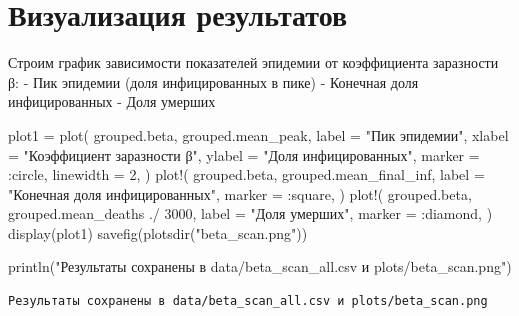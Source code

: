\documentclass[
  12pt,
  a4paper,
  DIV=11,
  numbers=noendperiod]{scrreprt}
\newenvironment{Shaded}{\begin{snugshade}}{\end{snugshade}}
\newcommand{\FloatTok}[1]{\textcolor[rgb]{0.68,0.00,0.00}{#1}}
\newcommand{\FunctionTok}[1]{\textcolor[rgb]{0.28,0.35,0.67}{#1}}
\newcommand{\NormalTok}[1]{\textcolor[rgb]{0.00,0.23,0.31}{#1}}
\newcommand{\OperatorTok}[1]{\textcolor[rgb]{0.37,0.37,0.37}{#1}}
\newcommand{\StringTok}[1]{\textcolor[rgb]{0.13,0.47,0.30}{#1}}
\begin{document}
\section{Визуализация
результатов}\label{ux432ux438ux437ux443ux430ux43bux438ux437ux430ux446ux438ux44f-ux440ux435ux437ux443ux43bux44cux442ux430ux442ux43eux432-2}

Строим график зависимости показателей эпидемии от коэффициента
заразности β: - Пик эпидемии (доля инфицированных в пике) - Конечная
доля инфицированных - Доля умерших

\begin{Shaded}
\begin{Highlighting}[]
\NormalTok{plot1 }\OperatorTok{=} \FunctionTok{plot}\NormalTok{(}
\NormalTok{    grouped.beta,}
\NormalTok{    grouped.mean\_peak,}
\NormalTok{    label }\OperatorTok{=} \StringTok{"Пик эпидемии"}\NormalTok{,}
\NormalTok{    xlabel }\OperatorTok{=} \StringTok{"Коэффициент заразности β"}\NormalTok{,}
\NormalTok{    ylabel }\OperatorTok{=} \StringTok{"Доля инфицированных"}\NormalTok{,}
\NormalTok{    marker }\OperatorTok{=} \OperatorTok{:}\NormalTok{circle,}
\NormalTok{    linewidth }\OperatorTok{=} \FloatTok{2}\NormalTok{,}
\NormalTok{)}
\FunctionTok{plot!}\NormalTok{(}
\NormalTok{    grouped.beta,}
\NormalTok{    grouped.mean\_final\_inf,}
\NormalTok{    label }\OperatorTok{=} \StringTok{"Конечная доля инфицированных"}\NormalTok{,}
\NormalTok{    marker }\OperatorTok{=} \OperatorTok{:}\NormalTok{square,}
\NormalTok{)}
\FunctionTok{plot!}\NormalTok{(}
\NormalTok{    grouped.beta,}
\NormalTok{    grouped.mean\_deaths }\OperatorTok{./} \FloatTok{3000}\NormalTok{,}
\NormalTok{    label }\OperatorTok{=} \StringTok{"Доля умерших"}\NormalTok{,}
\NormalTok{    marker }\OperatorTok{=} \OperatorTok{:}\NormalTok{diamond,}
\NormalTok{)}
\FunctionTok{display}\NormalTok{(plot1)}
\FunctionTok{savefig}\NormalTok{(}\FunctionTok{plotsdir}\NormalTok{(}\StringTok{"beta\_scan.png"}\NormalTok{))}

\FunctionTok{println}\NormalTok{(}\StringTok{"Результаты сохранены в data/beta\_scan\_all.csv и plots/beta\_scan.png"}\NormalTok{)}
\end{Highlighting}
\end{Shaded}



\begin{verbatim}
Результаты сохранены в data/beta_scan_all.csv и plots/beta_scan.png
\end{verbatim}
\end{document}
